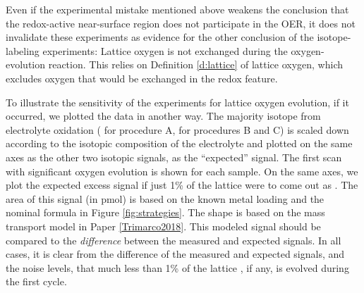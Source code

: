 Even if the experimental mistake mentioned above weakens the conclusion that the redox-active near-surface region does not participate in the OER, it does not invalidate these experiments as evidence for the other conclusion of the isotope-labeling experiments: Lattice oxygen is not exchanged during the oxygen-evolution reaction. This relies on Definition \ref{d:lattice} of lattice oxygen, which excludes oxygen that would be exchanged in the  redox feature.

To illustrate the sensitivity of the experiments for lattice oxygen evolution, if it occurred, we plotted the data in another way. The majority isotope from electrolyte oxidation ( for procedure A,  for procedures B and C) is scaled down according to the isotopic composition of the electrolyte and plotted on the same axes as the other two  isotopic signals, as the ``expected''  signal. The first scan with significant oxygen evolution is shown for each sample.  On the same axes, we plot the expected excess  signal if just 1\% of the lattice  were to come out as . The area of this signal (in pmol) is based on the known metal loading and the nominal formula in Figure \ref{fig:strategies}. The shape is based on the mass transport model in Paper \ref{Trimarco2018}. This modeled signal should be compared to the \textit{difference} between the measured and expected  signals. In all cases, it is clear from the difference of the measured and expected signals, and the noise levels, that much less than 1\% of the lattice , if any, is evolved during the first cycle.

